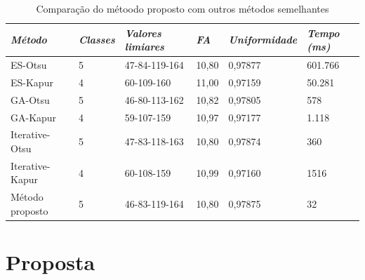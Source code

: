 \documentclass[12pt,oneside,a4paper,english,french,spanish,brazil,]{abntex2}
\begin{document}
\begin{table}
\centering
\caption{Comparação do métoodo proposto com outros métodos semelhantes}
\label{tab:TrCo_Bammouche_Resultados}
\begin{tabular}{llllll}
\hline
\textit{\textbf{\small{Método}}} & \textit{\textbf{\small{Classes}}} & \textit{\textbf{\small{Valores limiares}}} & \textit{\textbf{\small{FA}}} & \textit{\textbf{\small{Uniformidade}}} & \textit{\textbf{\small{Tempo (ms)}}} \\ \hline
ES-Otsu                  & 5                                   & 47-84-119-164                          & 10,80                           & 0,97877                        & 601.766                             \\
ES-Kapur                 & 4                                   & 60-109-160                             & 11,00                           & 0,97159                        & 50.281                              \\
GA-Otsu                  & 5                                   & 46-80-113-162                          & 10,82                           & 0,97805                        & 578                                 \\
GA-Kapur                 & 4                                   & 59-107-159                             & 10,97                           & 0,97177                        & 1.118                               \\
Iterative-Otsu           & 5                                   & 47-83-118-163                          & 10,80                           & 0,97874                        & 360                                 \\
Iterative-Kapur          & 4                                   & 60-108-159                             & 10,99                           & 0,97160                        & 1516                                \\
Método proposto          & 5                                   & 46-83-119-164                          & 10,80                           & 0,97875                        & 32                                  \\ \hline
\end{tabular}
\end{table}

\chapter{Proposta}
\label{chap:Proposta}
\end{document}
